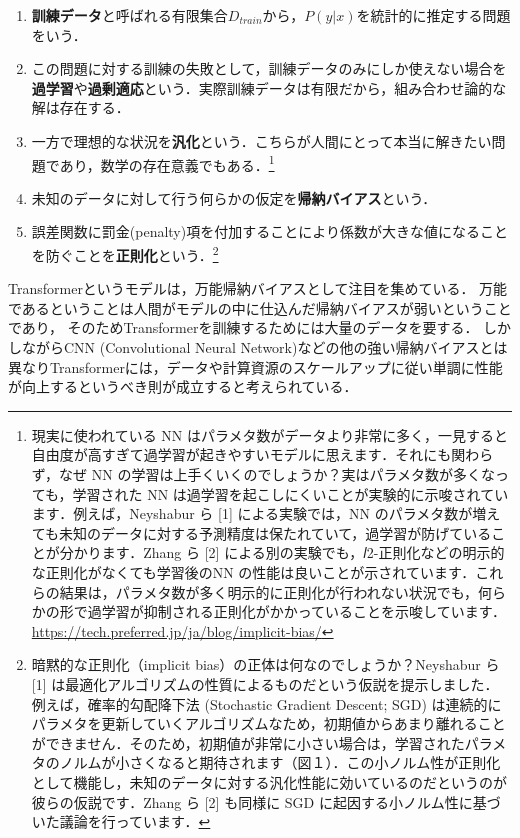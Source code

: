 \documentclass[uplatex,dvipdfmx]{jsreport}
\begin{document}
\begin{definition}\mbox{}
    \begin{enumerate}
        \item \textbf{訓練データ}と呼ばれる有限集合$D_{train}$から，$P(y|x)$を統計的に推定する問題をいう．
        \item この問題に対する訓練の失敗として，訓練データのみにしか使えない場合を\textbf{過学習}や\textbf{過剰適応}という．実際訓練データは有限だから，組み合わせ論的な解は存在する．
        \item 一方で理想的な状況を\textbf{汎化}という．こちらが人間にとって本当に解きたい問題であり，数学の存在意義でもある．\footnote{現実に使われている NN はパラメタ数がデータより非常に多く，一見すると自由度が高すぎて過学習が起きやすいモデルに思えます．それにも関わらず，なぜ NN の学習は上手くいくのでしょうか？実はパラメタ数が多くなっても，学習された NN は過学習を起こしにくいことが実験的に示唆されています．例えば，Neyshabur ら [1] による実験では，NN のパラメタ数が増えても未知のデータに対する予測精度は保たれていて，過学習が防げていることが分かります．Zhang ら [2] による別の実験でも，𝑙2-正則化などの明示的な正則化がなくても学習後のNN の性能は良いことが示されています．これらの結果は，パラメタ数が多く明示的に正則化が行われない状況でも，何らかの形で過学習が抑制される正則化がかかっていることを示唆しています．\url{https://tech.preferred.jp/ja/blog/implicit-bias/}}
        \item 未知のデータに対して行う何らかの仮定を\textbf{帰納バイアス}という．
        \item 誤差関数に罰金(penalty)項を付加することにより係数が大きな値になることを防ぐことを\textbf{正則化}という．\footnote{暗黙的な正則化（implicit bias）の正体は何なのでしょうか？Neyshabur ら [1] は最適化アルゴリズムの性質によるものだという仮説を提示しました．例えば，確率的勾配降下法 (Stochastic Gradient Descent; SGD) は連続的にパラメタを更新していくアルゴリズムなため，初期値からあまり離れることができません．そのため，初期値が非常に小さい場合は，学習されたパラメタのノルムが小さくなると期待されます（図１）．この小ノルム性が正則化として機能し，未知のデータに対する汎化性能に効いているのだというのが彼らの仮説です．Zhang ら [2] も同様に SGD に起因する小ノルム性に基づいた議論を行っています．}
    \end{enumerate}
\end{definition}

\begin{theorem}
    
\end{theorem}
\begin{remark}[Transformer]
    Transformerというモデルは，万能帰納バイアスとして注目を集めている．
    万能であるということは人間がモデルの中に仕込んだ帰納バイアスが弱いということであり，
    そのためTransformerを訓練するためには大量のデータを要する．
    しかしながらCNN (Convolutional Neural Network)などの他の強い帰納バイアスとは異なりTransformerには，データや計算資源のスケールアップに従い単調に性能が向上するというべき則が成立すると考えられている．
\end{remark}
\end{document}
